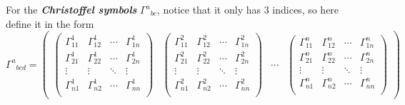 \documentclass[11pt]{article}
\begin{document}
For the \textbf{\emph{Christoffel symbols}} \({\Gamma^{a}}_{bc}\),
notice that it only has \(3\) indices, so here define it in the form \[
{\Gamma^{a}}_{bcd} = 
\begin{pmatrix}
\begin{pmatrix}
 {\Gamma^{1}_{11}} &  {\Gamma^{1}_{12}} & \cdots &  {\Gamma^{1}_{1n}} \\ 
 {\Gamma^{1}_{21}} &  {\Gamma^{1}_{22}} & \cdots &  {\Gamma^{1}_{2n}} \\ 
 \vdots & \vdots & \ddots &\vdots \\ 
 {\Gamma^{1}_{n1}} &  {\Gamma^{1}_{n2}} & \cdots &  {\Gamma^{1}_{nn}} \\ 
\end{pmatrix}
& 
\begin{pmatrix}
 {\Gamma^{2}_{11}} &  {\Gamma^{2}_{12}} & \cdots &  {\Gamma^{2}_{1n}} \\ 
 {\Gamma^{2}_{21}} &  {\Gamma^{2}_{22}} & \cdots &  {\Gamma^{2}_{2n}} \\ 
 \vdots & \vdots & \ddots &\vdots \\ 
 {\Gamma^{2}_{n1}} &  {\Gamma^{2}_{n2}} & \cdots &  {\Gamma^{2}_{nn}} \\ 
\end{pmatrix}
& \cdots & 
\begin{pmatrix}
 {\Gamma^{n}_{11}} &  {\Gamma^{n}_{12}} & \cdots &  {\Gamma^{n}_{1n}} \\ 
 {\Gamma^{n}_{21}} &  {\Gamma^{n}_{22}} & \cdots &  {\Gamma^{n}_{2n}} \\ 
 \vdots & \vdots & \ddots &\vdots \\ 
 {\Gamma^{n}_{n1}} &  {\Gamma^{n}_{n2}} & \cdots &  {\Gamma^{n}_{nn}} \\ 
\end{pmatrix}
\end{pmatrix}
\]
\end{document}
